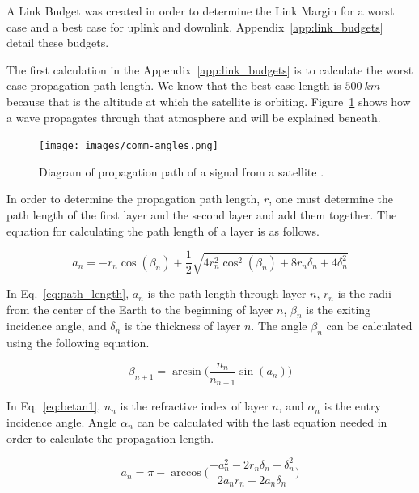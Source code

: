 \documentclass[12pt]{article}
\begin{document}
A Link Budget was created in order to determine the Link Margin for a worst case and a best case for uplink and downlink. Appendix~\ref{app:link_budgets} detail these budgets.

The first calculation in the Appendix~\ref{app:link_budgets} is to calculate the worst case propagation path length. We know that the best case length is $500\ km$ because that is the altitude at which the satellite is orbiting. Figure~\ref{fig:comm_angles} shows how a wave propagates through that atmosphere and will be explained beneath.

\begin{figure}[ht]
\centering
  \texttt{[image: images/comm-angles.png]}
\caption{Diagram of propagation path of a signal from a satellite \cite{ITU-R}.}
\label{fig:comm_angles}
\end{figure}

In order to determine the propagation path length, $r$, one must determine the path length of the first layer and the second layer and add them together. The equation for calculating \cite{ITU-R} the path length of a layer is as follows.

\begin{equation}\label{eq:path_length}
a_n = -r_n\cos(\beta_n) + \frac{1}{2}\sqrt{4r_n^2\cos^2(\beta_n)+8r_n\delta_n+4\delta_n^2} 
\end{equation}

In Eq.~\ref{eq:path_length}, $a_n$ is the path length through layer $n$, $r_n$ is the radii from the center of the Earth to the beginning of layer $n$, $\beta_n$ is the exiting incidence angle, and $\delta_n$ is the thickness of layer $n$.
The angle $\beta_n$ can be calculated \cite{ITU-R} using the following equation.

\begin{equation}\label{eq:betan1}
\beta_{n+1} = \arcsin\biggl(\frac{n_n}{n_{n+1}}\sin(a_n)\biggr) 
\end{equation}

In Eq.~\ref{eq:betan1}, $n_n$ is the refractive index of layer $n$, and $\alpha_n$ is the entry incidence angle. Angle $\alpha_n$ can be calculated with the last equation needed in order to calculate \cite{ITU-R} the propagation length.

\begin{equation}\label{eq:a_n}
a_n = \pi - \arccos \biggl(\frac{-a_n^2 - 2r_n\delta_n - \delta_n^2}{2a_n r_n + 2a_n \delta_n}\biggr) 
\end{equation}
\end{document}
